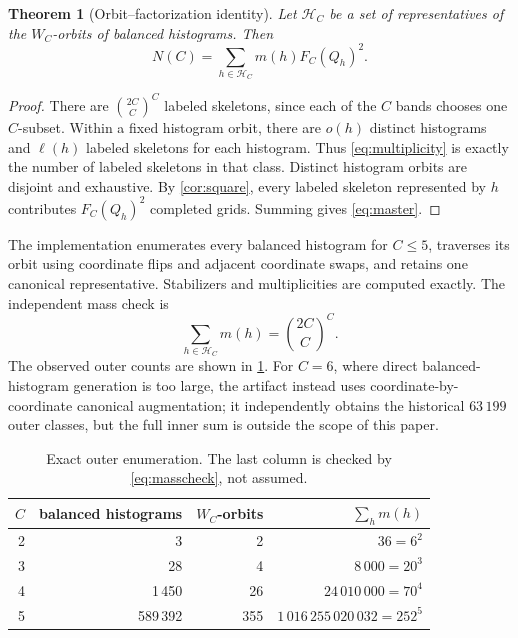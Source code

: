 \documentclass[11pt]{article}
\newtheorem{theorem}{Theorem}[section]
\theoremstyle{definition}
\theoremstyle{remark}
\begin{document}
\begin{theorem}[Orbit--factorization identity]
Let $\mathcal H_C$ be a set of representatives of the $W_C$-orbits of
balanced histograms.  Then
\begin{equation}
  \boxed{
  N(C)=\sum_{h\in\mathcal H_C}m(h)F_C(Q_h)^2.}
  \label{eq:master}
\end{equation}
\end{theorem}

\begin{proof}
There are $\binom{2C}{C}^C$ labeled skeletons, since each of the $C$ bands
chooses one $C$-subset.  Within a fixed histogram orbit, there are $o(h)$
distinct histograms and $\ell(h)$ labeled skeletons for each histogram.
Thus \eqref{eq:multiplicity} is exactly the number of labeled skeletons in
that class.  Distinct histogram orbits are disjoint and exhaustive.  By
\cref{cor:square}, every labeled skeleton represented by $h$ contributes
$F_C(Q_h)^2$ completed grids.  Summing gives \eqref{eq:master}.
\end{proof}

The implementation enumerates every balanced histogram for $C\le5$, traverses
its orbit using coordinate flips and adjacent coordinate swaps, and retains
one canonical representative.  Stabilizers and multiplicities are computed
exactly.  The independent mass check is
\begin{equation}
  \sum_{h\in\mathcal H_C}m(h)=\binom{2C}{C}^{C}.
  \label{eq:masscheck}
\end{equation}
The observed outer counts are shown in \cref{tab:outer}.  For $C=6$, where
direct balanced-histogram generation is too large, the artifact instead uses
coordinate-by-coordinate canonical augmentation; it independently obtains
the historical $63\,199$ outer classes, but the full inner sum is outside the
scope of this paper.

\begin{table}[H]
  \centering
  \caption{Exact outer enumeration.  The last column is checked by
  \eqref{eq:masscheck}, not assumed.}
  \label{tab:outer}
  \begin{tabular}{rrrr}
    \toprule
    $C$ & balanced histograms & $W_C$-orbits & $\sum_h m(h)$ \\
    \midrule
    2 & 3       & 2   & $36=6^2$ \\
    3 & 28      & 4   & $8\,000=20^3$ \\
    4 & 1\,450  & 26  & $24\,010\,000=70^4$ \\
    5 & 589\,392& 355 & $1\,016\,255\,020\,032=252^5$ \\
    \bottomrule
  \end{tabular}
\end{table}
\end{document}
